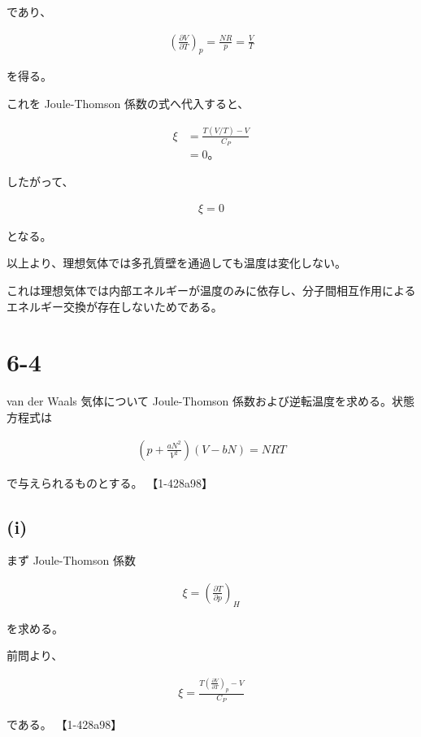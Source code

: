 \documentclass[platex,dvipdfmx,a4paper]{jsarticle}
\begin{document}
であり、

\begin{align*}
\left(
\frac{\partial V}{\partial T}
\right)_p
=
\frac{NR}{p}
=
\frac{V}{T}
\end{align*}

を得る。

これを Joule-Thomson 係数の式へ代入すると、

\begin{align*}
\xi
&=
\frac{
T(V/T)-V
}{
C_P
}
\\
&=
0。
\end{align*}

したがって、

\begin{align*}
\boxed{
\xi=0
}
\end{align*}

となる。

以上より、理想気体では多孔質壁を通過しても温度は変化しない。

これは理想気体では内部エネルギーが温度のみに依存し、分子間相互作用によるエネルギー交換が存在しないためである。
\section{6-4}

van der Waals 気体について Joule-Thomson 係数および逆転温度を求める。状態方程式は

\begin{align*}
\left(
p+\frac{aN^2}{V^2}
\right)
(V-bN)
=
NRT
\end{align*}

で与えられるものとする。 【1-428a98】

\subsection{(i)}

まず Joule-Thomson 係数

\begin{align*}
\xi
=
\left(
\frac{\partial T}{\partial p}
\right)_H
\end{align*}

を求める。

前問より、

\begin{align*}
\xi
=
\frac{
T
\left(
\frac{\partial V}{\partial T}
\right)_p
-V
}{
C_P
}
\end{align*}

である。 【1-428a98】
\end{document}
